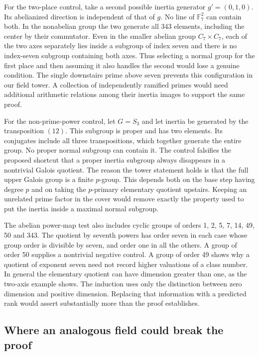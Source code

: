 \documentclass[12pt,letterpaper]{article}
\begin{document}
For the two-place control, take a second possible inertia generator \(g'=(0,1,0)\). Its abelianized direction is independent of that of \(g\). No line of \(\mathbb F_7^2\) can contain both. In the nonabelian group the two generate all 343 elements, including the center by their commutator. Even in the smaller abelian group \(C_7\times C_7\), each of the two axes separately lies inside a subgroup of index seven and there is no index-seven subgroup containing both axes. Thus selecting a normal group for the first place and then assuming it also handles the second would lose a genuine condition. The single downstairs prime above seven prevents this configuration in our field tower. A collection of independently ramified primes would need additional arithmetic relations among their inertia images to support the same proof.

For the non-prime-power control, let \(G=S_3\) and let inertia be generated by the transposition \((12)\). This subgroup is proper and has two elements. Its conjugates include all three transpositions, which together generate the entire group. No proper normal subgroup can contain it. The control falsifies the proposed shortcut that a proper inertia subgroup always disappears in a nontrivial Galois quotient. The reason the tower statement holds is that the full upper Galois group is a finite \(p\)-group. This depends both on the base step having degree \(p\) and on taking the \(p\)-primary elementary quotient upstairs. Keeping an unrelated prime factor in the cover would remove exactly the property used to put the inertia inside a maximal normal subgroup.

The abelian power-map test also includes cyclic groups of orders 1, 2, 5, 7, 14, 49, 50 and 343. The quotient by seventh powers has order seven in each case whose group order is divisible by seven, and order one in all the others. A group of order 50 supplies a nontrivial negative control. A group of order 49 shows why a quotient of exponent seven need not record higher valuations of a class number. In general the elementary quotient can have dimension greater than one, as the two-axis example shows. The induction uses only the distinction between zero dimension and positive dimension. Replacing that information with a predicted rank would assert substantially more than the proof establishes.

\subsection{Where an analogous field could break the proof}
\end{document}
